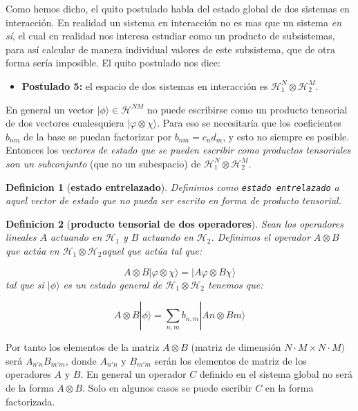 \documentclass[12pt]{book}
\numberwithin{equation}{chapter}
\numberwithin{figure}{chapter}
\newcommand{\Hcal}{\mathcal{H}}
\newtheorem{definition}{Definicion}[section]
\begin{document}
Como hemos dicho, el quito postulado habla del estado global de dos sistemas en interacción. En realidad un sistema en interacción no es mas que un sistema \textit{en sí}, el cual en realidad nos interesa estudiar como un producto de subsistemas, para así calcular de manera individual valores de este subsistema, que de otra forma sería imposible. El quito postulado nos dice:

\begin{itemize}
\item \textbf{Postulado 5:} el espacio de dos sistemas en interacción es $\Hcal_1^N \otimes \Hcal_2^M$.
\end{itemize}

En general un vector $|\phi\rangle \in \Hcal^{NM}$ no puede escribirse como un producto tensorial de dos vectores cualesquiera $| \varphi \otimes \chi \rangle$. Para eso se necesitaría que los coeficientes $b_{nm}$ de la base se puedan factorizar por $b_{nm} = c_n d_m$, y esto no siempre es posible. Entonces los \textit{vectores de estado que se pueden escribir como productos tensoriales son un subconjunto} (que no un subespacio) de $\Hcal_1^N \otimes \Hcal_2^M$. \\

\begin{definition}[\textbf{estado entrelazado}]
Definimos como \texttt{estado entrelazado} a aquel vector de estado que no pueda ser escrito en forma de producto tensorial. \\
\end{definition} 


\begin{definition}[\textbf{producto tensorial de dos operadores}]
Sean los operadores lineales $A$ actuando en $\Hcal_1$ y $B$ actuando en $\Hcal_2$. Definimos el operador $A\otimes B$ que actúa en $\Hcal_ 1 \otimes \Hcal_2$aquel que actúa tal que:

\begin{equation}
A \otimes B |\varphi \otimes \chi \rangle = |A \varphi \otimes B \chi  \rangle
\end{equation}
tal que si $|\phi\rangle$ es un estado general de $\Hcal_ 1 \otimes \Hcal_2$ tenemos que:

\begin{equation}
A \otimes B | \phi \rangle = \sum_{n,m} b_{n,m} |A n \otimes B m \rangle
\end{equation}
\end{definition}

Por tanto los elementos de la matriz $A \otimes B$ (matriz de dimensión $N\cdot M \times N \cdot M)$ será $A_{n'n} B_{m'm}$, donde $A_{n'n}$ y $B_{m'm}$ serán los elementos de matriz de los operadores $A$ y $B$. En general un operador $C$ definido en el sistema global no será de la forma $A\otimes B$. Solo en algunos casos se puede escribir $C$ en la forma factorizada.
\end{document}

